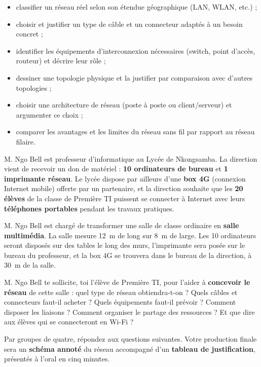 \documentclass[11pt]{article}
\newcommand{\cle}[1]{{\popxbold\color{popdark}#1}}
\newcounter{popsec}
\newcounter{popsub}
\newcommand{\courssub}[1]{%
  \stepcounter{popsub}%
  \par\vspace{9pt}\noindent{\popxbold\fontsize{11.5}{13}\selectfont\color{popink}{\color{poporange}\thepopsec.\thepopsub}\hspace{6pt}#1}\par\nopagebreak\vspace{4pt}
}
\begin{document}
\begin{itemize}
  \item \cle{classifier} un réseau réel selon son étendue géographique (LAN, WLAN, etc.) ;
  \item \cle{choisir} et justifier un type de câble et un connecteur adaptés à un besoin concret ;
  \item \cle{identifier} les équipements d'interconnexion nécessaires (switch, point d'accès, routeur) et décrire leur rôle ;
  \item \cle{dessiner} une topologie physique et la justifier par comparaison avec d'autres topologies ;
  \item \cle{choisir} une architecture de réseau (poste à poste ou client/serveur) et argumenter ce choix ;
  \item \cle{comparer} les avantages et les limites du réseau sans fil par rapport au réseau filaire.
\end{itemize}

\courssub{Situation}

M. Ngo Bell est professeur d'informatique au Lycée de Nkongsamba. La direction vient de recevoir un don de matériel : \textbf{10 ordinateurs de bureau} et \textbf{1 imprimante réseau}. Le lycée dispose par ailleurs d'une \textbf{box 4G} (connexion Internet mobile) offerte par un partenaire, et la direction souhaite que les \textbf{20 élèves} de la classe de Première TI puissent se connecter à Internet avec leurs \textbf{téléphones portables} pendant les travaux pratiques.

M. Ngo Bell est chargé de transformer une salle de classe ordinaire en \textbf{salle multimédia}. La salle mesure \SI{12}{m} de long sur \SI{8}{m} de large. Les 10 ordinateurs seront disposés sur des tables le long des murs, l'imprimante sera posée sur le bureau du professeur, et la box 4G se trouvera dans le bureau de la direction, à \SI{30}{m} de la salle.

M. Ngo Bell te sollicite, toi l'élève de Première TI, pour l'aider à \textbf{concevoir le réseau} de cette salle : quel type de réseau obtiendra-t-on ? Quels câbles et connecteurs faut-il acheter ? Quels équipements faut-il prévoir ? Comment disposer les liaisons ? Comment organiser le partage des ressources ? Et que dire aux élèves qui se connecteront en Wi-Fi ?

\courssub{Consignes}

Par groupes de quatre, répondez aux questions suivantes. Votre production finale sera un \textbf{schéma annoté} du réseau accompagné d'un \textbf{tableau de justification}, présentés à l'oral en cinq minutes.
\end{document}
